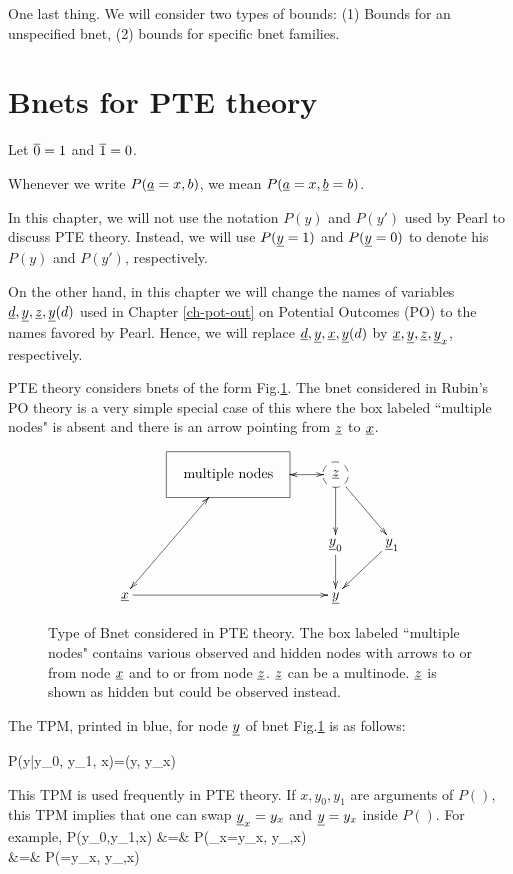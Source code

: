 One last thing. 
We will consider two types of bounds: 
(1) Bounds for an unspecified bnet,
(2) bounds for specific bnet families.



\section{Bnets for PTE theory}
\quad

Let $\overline{0}=1$ and $\overline{1}=0$.

Whenever we write $P({\underline{a}}=x, b)$, 
we mean $P({\underline{a}}=x, {\underline{b}}=b)$.

In this chapter, we will
not use the notation
$P(y)$ and $P(y')$
used by Pearl to
discuss PTE theory.
Instead, we will
use $P({\underline{y}}=1)$ and
$P({\underline{y}}=0)$
to denote his 
$P(y)$ and $P(y')$, respectively. 


On the other hand, 
in this chapter
we will change the names 
of variables ${\underline{d}}, {\underline{y}}, {\underline{z}}, {\underline{y}}(d)$
used 
in Chapter \ref{ch-pot-out} on Potential
Outcomes (PO)
to the names favored by Pearl.
Hence, we will replace
${\underline{d}}, {\underline{y}}, {\underline{x}}, {\underline{y}}(d)$
by
${\underline{x}}, {\underline{y}}, {\underline{z}}, {\underline{y}}_x$,
respectively.



PTE theory considers bnets of the form
Fig.\ref{fig-pte-bnet}.
The bnet considered in Rubin's
PO theory
is a very simple special case
of this where the box
labeled ``multiple nodes"
is absent and there is an
arrow pointing
from ${\underline{z}}$ to ${\underline{x}}$.


\begin{figure}[h!]
$$
\xymatrix{
&*++++[F]{\text{multiple nodes}}\ar@{<->}[ldd]
\ar@{<->}[r]
&*++[F-o]{\rvz}\ar[rd]\ar[d]
\\
&&\rvy_0\ar[d]
&\rvy_1\ar[ld]
\\
\rvx\ar[rr]
&&\rvy
}$$
\caption{Type of Bnet
considered in PTE theory.
The box labeled ``multiple nodes"
contains various observed 
and hidden nodes with
arrows
to or from node ${\underline{x}}$
and to or from
node ${\underline{z}}$.
${\underline{z}}$ can be a multinode.
${\underline{z}}$ 
is shown
as hidden but
could be observed instead.
}
\label{fig-pte-bnet}
\end{figure}

The TPM, printed in blue,
 for node ${\underline{y}}$
of bnet Fig.\ref{fig-pte-bnet}
is as follows:


\beq\color{blue}
P(y|y_0, y_1, x)=\delta(y, y_x)
\label{eq-tpm-y-yx}
\eeq

This TPM is used 
frequently
in PTE theory.  If $x,y_0, y_1$
are arguments
of $P()$, this TPM implies that one
can swap 
${\underline{y}}_x=y_x$
and ${\underline{y}}=y_x$
inside $P()$. For example,
\beqa
P(y_0,y_1,x)
&=&
P({\color{red}\rvy_x}=y_x,
 y_{},x)
\\
&=&
P({\color{red}\rvy}=y_x,
 y_{},x)
\eeqa

